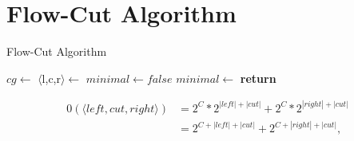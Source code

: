 \chapter{Flow-Cut Algorithm}\label{cha:flowCut}

\begin{algorithm}
\begin{algorithmic}
\caption{Flow-Cut Algorithm}\label{alg:flowCut}
\State $cg \gets$ 
\State $\langle$l,c,r$\rangle \gets$ 
\State $minimal \gets false$
\State $minimal \gets$ 
\EndWhile
\State \textbf{return} 
\EndProcedure
\end{algorithmic}
\end{algorithm}


\begin{equation}
\begin{aligned}
0(\langle left,cut,right\rangle) &= 2^C * 2^{|left|+|cut|} + 2^C * 2^{|right|+|cut|}\\
&= 2^{C+|left|+|cut|} + 2^{C+|right|+|cut|},
\end{aligned}
\end{equation}

